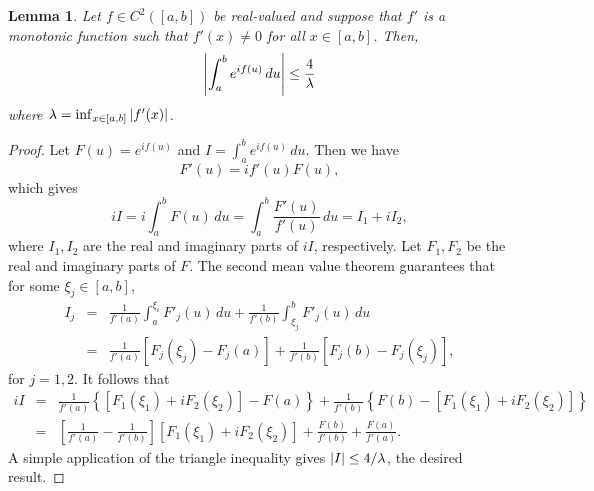 \documentclass[11pt, letter]{book}
\newtheorem{lemma}[theorem]{Lemma}
\newcommand{\lb}{\left[}
\newcommand{\rb}{\right]}
\newcommand{\lc}{\left\{}
\newcommand{\rc}{\right\}}
\newcommand{\f}[2]{\frac{#1}{#2}}
\begin{document}
\begin{framed}
\begin{lemma}\label{lem:VdC_1}
Let $f\in C^2([a,b])$ be real-valued and suppose that $f'$ is a monotonic function such that $f'(x) \neq 0$ for all $x\in [a,b]$. Then,
\begin{equation*}
    \abs{\int^b_a e^{if(u)}\,du} \leq \f{4}{\lambda}
\end{equation*}
where $\lambda = \inf_{x\in [a,b]} \abs{f'(x)}$.
\end{lemma}
\end{framed}
\begin{proof}
Let $F(u) = e^{if(u)}$ and $I = \int^b_a e^{if(u)}\,du$. Then we have
\begin{equation*}
    F'(u) = if'(u)F(u),
\end{equation*}
which gives
\begin{equation*}
    iI = i\int^b_a F(u)\,du = \int^b_a \f{F'(u)}{f'(u)}\,du = I_1 + iI_2, 
\end{equation*}
where $I_1, I_2$ are the real and imaginary parts of $iI$, respectively. Let $F_1, F_2$ be the real and imaginary parts of $F$. The second mean value theorem guarantees that for some $\xi_j \in [a,b]$,
\begin{eqnarray*}
    I_j &=& \f{1}{f'(a)}\int^{\xi_i}_a F'_j(u)\,du + \f{1}{f'(b)}\int^b_{\xi_j}F'_j(u)\,du\\
    &=& \f{1}{f'(a)}\lb F_j(\xi_j) - F_j(a)\rb + \f{1}{f'(b)}\lb F_j(b) - F_j(\xi_j) \rb,
\end{eqnarray*}
for $j=1,2$. It follows that
\begin{eqnarray*}
    iI 
    &=& \f{1}{f'(a)}\lc \lb F_1(\xi_1) + iF_2(\xi_2) \rb - F(a) \rc + \f{1}{f'(b)}\lc F(b) - \lb F_1(\xi_1) + iF_2(\xi_2) \rb\rc \\
    &=& \lb \f{1}{f'(a)}- \f{1}{f'(b)} \rb \lb F_1(\xi_1) + iF_2(\xi_2) \rb + \f{F(b)}{f'(b)} + \f{F(a)}{f'(a)}.
\end{eqnarray*}
A simple application of the triangle inequality gives $\abs{I} \leq 4/\lambda$, the desired result.
\end{proof}
\end{document}
